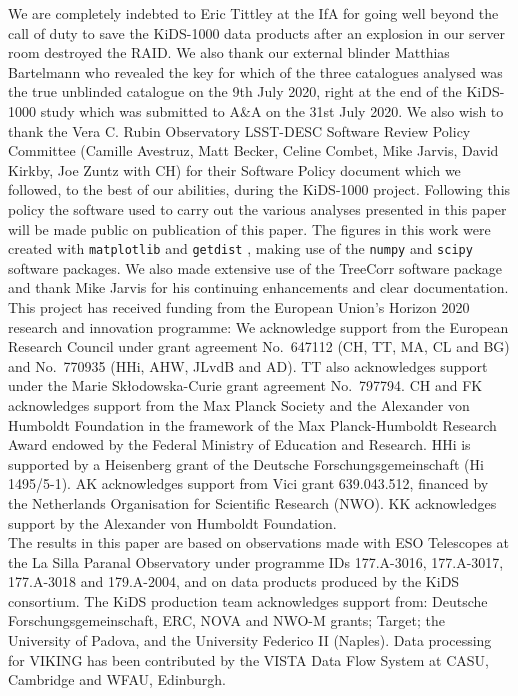 \documentclass{aa}
\newcommand{\software}[1]{\texttt{#1}}
\begin{document}
\begin{acknowledgements}
We are completely indebted to Eric Tittley at the IfA for going well beyond the call of duty to save the KiDS-1000 data products after an explosion in our server room destroyed the RAID.   We also thank
our external blinder Matthias Bartelmann who revealed the key for which of the three catalogues analysed was the true unblinded catalogue on the 9th July 2020, right at the end of the KiDS-1000 study which was submitted to A\&A on the 31st July 2020.   We also wish to thank the Vera C. Rubin Observatory LSST-DESC Software Review Policy Committee (Camille Avestruz, Matt Becker, Celine Combet, Mike Jarvis, David Kirkby, Joe Zuntz with CH) for their Software Policy document which we followed, to the best of our abilities, during the KiDS-1000 project.   Following this policy the software used to carry out the various analyses presented in this paper will be made public on publication of this paper. 
The figures in this work were created with \software{matplotlib} \citep{Hunter2007} and \software{getdist} \citep{Lewis2019}, making use of the 
\software{numpy} \citep{Oliphant2006} and \software{scipy} \citep{Jones2001} software packages. We also made extensive use of the {\sc TreeCorr} software package and thank
Mike Jarvis for his continuing enhancements and clear documentation.\\

This project has received funding from the European Union's Horizon 2020 research and innovation programme: We acknowledge support from the European Research Council under grant agreement No.~647112 (CH, TT, MA, CL and BG) and No.~770935 (HHi, AHW, JLvdB and AD). TT also acknowledges support under the Marie Sk\l{}odowska-Curie grant agreement No.~797794. CH and FK acknowledges support from the Max Planck Society and the Alexander von Humboldt Foundation in the framework of the Max Planck-Humboldt Research Award endowed by the Federal Ministry of Education and Research. HHi is supported by a Heisenberg grant of the Deutsche Forschungsgemeinschaft (Hi 1495/5-1). AK acknowledges support from Vici grant 639.043.512, financed by the Netherlands Organisation for Scientific Research (NWO). KK acknowledges support by the Alexander von Humboldt Foundation.\\
%
The results in this paper are based on observations made with ESO Telescopes at the La Silla Paranal Observatory under programme IDs 177.A-3016, 177.A-3017, 177.A-3018 and 179.A-2004, and on data products produced by the KiDS consortium. The KiDS production team acknowledges support from: Deutsche Forschungsgemeinschaft, ERC, NOVA and NWO-M grants; Target; the University of Padova, and the University Federico II (Naples).  Data processing for VIKING has been contributed by the VISTA Data Flow System at CASU, Cambridge and WFAU, Edinburgh. 


\end{acknowledgements}
\end{document}
